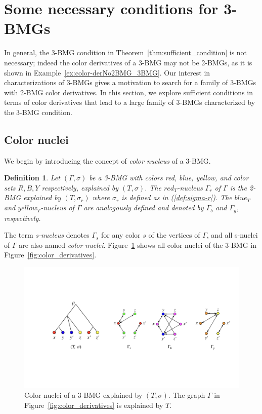 \documentclass[final,3p,times]{elsarticle}
\newtheorem{definition}{Definition}[section]
\begin{document}
\section{Some necessary conditions for 3-BMGs}
\label{sec:nec_condition}
In general, the 3-BMG condition in Theorem~\ref{thm:sufficient_condition} is not necessary; indeed the color derivatives of a 3-BMG may not be 2-BMGs, as it is shown in Example~\ref{ex:color-derNo2BMG_3BMG}. 
Our interest in characterizations of 3-BMGs gives a motivation to search for a family of 3-BMGs with 2-BMG color derivatives.
In this section, we explore sufficient conditions in terms of color derivatives that lead to a large family of 3-BMGs characterized by the 3-BMG condition. 

\subsection{Color nuclei}
We begin by introducing the concept of \emph{color nucleus} of a 3-BMG. 
\begin{definition}
Let $(\Gamma,\sigma)$ be a 3-BMG with colors red, blue, yellow, and color sets $R,B,Y$ respectively, explained by $(T,\sigma)$. The $red_T${\emph{-nucleus}} $\Gamma_r$ of $\Gamma$ is the 2-BMG explained by $(T,\sigma_r)$ where $\sigma_r$ is defined as in (\ref{def:sigma-r}). The $blue_T$ and $yellow_T${\emph{-nucleus}} of $\Gamma$ are analogously defined and denoted by $\Gamma_b$ and $\Gamma_y$, respectively. 
\end{definition}
The term \emph{s-nucleus} denotes $\Gamma_s$ for any color $s$ of the vertices of $\Gamma$, and all s-nuclei of $\Gamma$ are also named \emph{color nuclei}. Figure~\ref{fig:color_nuclei} shows all color nuclei of the 3-BMG in Figure~\ref{fig:color_derivatives}.
\begin{figure}[ht]
  \centering
    \includegraphics[width=16cm]{figures/color_nuclei.jpeg}
    \caption{Color nuclei of a 3-BMG explained by $(T,\sigma)$. The graph $\Gamma$ in Figure~\ref{fig:color_derivatives} is explained by $T$.}
      \label{fig:color_nuclei}
\end{figure}
\end{document}
